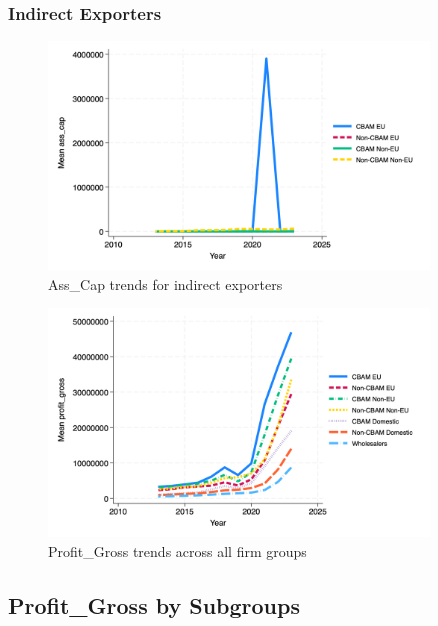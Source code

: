 \documentclass{article}
\begin{document}
\subsubsection{Indirect Exporters}
\begin{figure}[h!]
\centering
\includegraphics[width=0.9\textwidth]{ass_cap_indir.png}
\caption{Ass_Cap trends for indirect exporters}
\label{fig:ass_cap_indir}
\end{figure}

\begin{figure}[h!]
\centering
\includegraphics[width=0.9\textwidth]{profit_gross_main_groups.png}
\caption{Profit_Gross trends across all firm groups}
\label{fig:profit_gross_main}
\end{figure}

\subsection{Profit_Gross by Subgroups}
\end{document}
